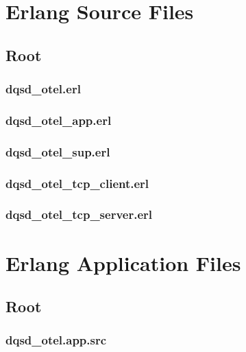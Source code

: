 \chapter{Erlang Source Files}

\section{Root}

\subsection{dqsd\_otel.erl}


\subsection{dqsd\_otel\_app.erl}


\subsection{dqsd\_otel\_sup.erl}


\subsection{dqsd\_otel\_tcp\_client.erl}


\subsection{dqsd\_otel\_tcp\_server.erl}


\chapter{Erlang Application Files}

\section{Root}

\subsection{dqsd\_otel.app.src}

